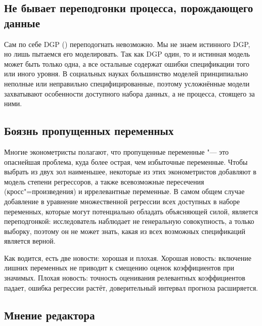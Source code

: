 \documentclass[final,pdftex]{../../template/epsilonj}
\begin{document}
\subsection{Не бывает переподгонки процесса, порождающего данные}

Сам по себе DGP () переподогнать невозможно. Мы не знаем истинного DGP, но лишь пытаемся его моделировать. Так как DGP один, то и истинная модель может быть только одна, а все остальные содержат ошибки спецификации того или иного уровня. В социальных науках большинство моделей принципиально неполные или неправильно специфицированные, поэтому усложнённые модели захватывают особенности доступного набора данных, а не процесса, стоящего за ними.

\subsection{Боязнь пропущенных переменных}

Многие эконометристы полагают, что пропущенные переменные "--- это опаснейшая проблема, куда более острая, чем избыточные переменные. Чтобы выбрать из двух зол наименьшее, некоторые из этих эконометристов добавляют в модель степени регрессоров, а также всевозможные пересечения (кросс"=произведения) и иррелевантные переменные. В самом общем случае добавление в уравнение множественной регрессии всех доступных в наборе переменных, которые могут потенциально обладать объясняющей силой, является переподгонкой: исследователь наблюдает не генеральную совокупность, а только выборку, поэтому он не может знать, какая из всех возможных спецификаций является верной.

Как водится, есть две новости: хорошая и плохая. Хорошая новость: включение лишних переменных не приводит к смещению оценок коэффициентов при значимых. Плохая новость: точность оценивания релевантных коэффициентов падает, ошибка регрессии растёт, доверительный интервал прогноза расширяется.

\subsection{Мнение редактора}
\end{document}
